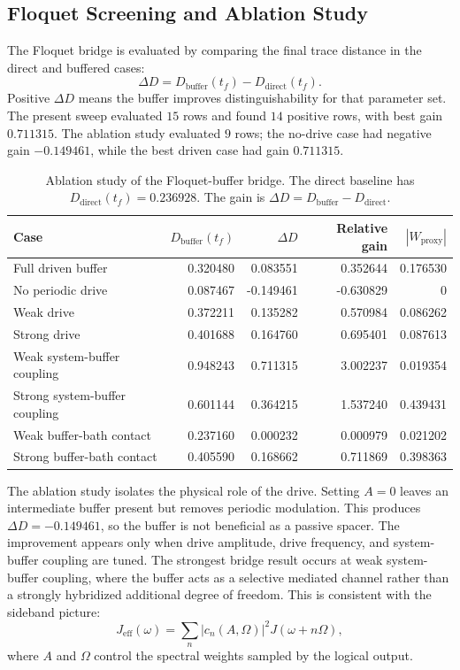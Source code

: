 \documentclass[11pt]{article}
\begin{document}
\subsection{Floquet Screening and Ablation Study}

The Floquet bridge is evaluated by comparing the final trace distance in the direct and
buffered cases:
\begin{equation}
    \Delta D
    =
    D_{\mathrm{buffer}}(t_f)-D_{\mathrm{direct}}(t_f).
\end{equation}
Positive $\Delta D$ means the buffer improves distinguishability for that parameter set.
The present sweep evaluated $15$ rows and found $14$ positive rows, with best gain
$0.711315$.  The ablation study evaluated $9$ rows; the no-drive case had negative gain
$-0.149461$, while the best driven case had gain $0.711315$.

\begin{table}[H]
\centering
\caption{Ablation study of the Floquet-buffer bridge.  The direct baseline has
$D_{\mathrm{direct}}(t_f)=0.236928$.  The gain is
$\Delta D=D_{\mathrm{buffer}}-D_{\mathrm{direct}}$.}
\begin{tabular}{lrrrr}
\toprule
Case & $D_{\mathrm{buffer}}(t_f)$ & $\Delta D$ & Relative gain & $|W_{\mathrm{proxy}}|$ \\
\midrule
Full driven buffer & 0.320480 & 0.083551 & 0.352644 & 0.176530 \\
No periodic drive & 0.087467 & -0.149461 & -0.630829 & 0 \\
Weak drive & 0.372211 & 0.135282 & 0.570984 & 0.086262 \\
Strong drive & 0.401688 & 0.164760 & 0.695401 & 0.087613 \\
Weak system-buffer coupling & 0.948243 & 0.711315 & 3.002237 & 0.019354 \\
Strong system-buffer coupling & 0.601144 & 0.364215 & 1.537240 & 0.439431 \\
Weak buffer-bath contact & 0.237160 & 0.000232 & 0.000979 & 0.021202 \\
Strong buffer-bath contact & 0.405590 & 0.168662 & 0.711869 & 0.398363 \\
\bottomrule
\end{tabular}
\end{table}

The ablation study isolates the physical role of the drive.  Setting $A=0$ leaves an
intermediate buffer present but removes periodic modulation.  This produces
$\Delta D=-0.149461$, so the buffer is not beneficial as a passive spacer.  The improvement
appears only when drive amplitude, drive frequency, and system-buffer coupling are tuned.
The strongest bridge result occurs at weak system-buffer coupling, where the buffer acts as a
selective mediated channel rather than a strongly hybridized additional degree of freedom.
This is consistent with the sideband picture:
\begin{equation}
    J_{\mathrm{eff}}(\omega)
    =
    \sum_{n}|c_n(A,\Omega)|^2J(\omega+n\Omega),
\end{equation}
where $A$ and $\Omega$ control the spectral weights sampled by the logical output.
\end{document}
